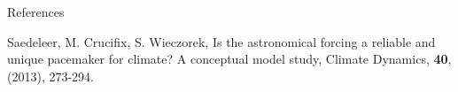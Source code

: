 \documentclass[final]{beamer}
\newlength{\onecolwid}
\begin{document}
\begin{frame}[t]
\begin{columns}[t]
\begin{column}{\onecolwid}
\begin{block}{References}
{\begin{thebibliography}{99}
Saedeleer, M. Crucifix, S. Wieczorek, Is the astronomical forcing a reliable and unique pacemaker for climate? A
conceptual model study, Climate Dynamics, \textbf{40}, (2013), 273-294.
		        \end{thebibliography}}
			      \vspace{0.75in}
    \end{block}
    \end{column}
 \end{columns}
\end{frame}
\end{document}
